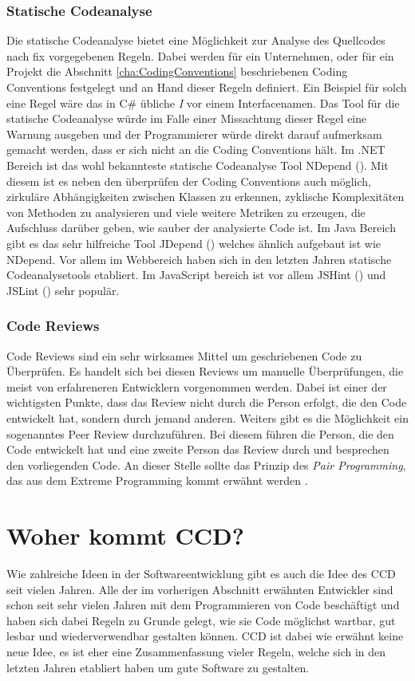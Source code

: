 \subsubsection{Statische Codeanalyse}
Die statische Codeanalyse bietet eine Möglichkeit zur Analyse des Quellcodes nach fix vorgegebenen Regeln. Dabei werden für ein Unternehmen, oder für ein Projekt die Abschnitt \ref{cha:CodingConventions} beschriebenen Coding Conventions festgelegt und an Hand dieser Regeln definiert. Ein Beispiel für solch eine Regel wäre das in C\# übliche \textit{I} vor einem Interfacenamen. Das Tool für die statische Codeanalyse würde im Falle einer Missachtung dieser Regel eine Warnung ausgeben und der Programmierer würde direkt darauf aufmerksam gemacht werden, dass er sich nicht an die Coding Conventions hält. Im .NET Bereich ist das wohl bekannteste statische Codeanalyse Tool NDepend (\cite{NDepend2016}). Mit diesem ist es neben den überprüfen der Coding Conventions auch möglich, zirkuläre Abhängigkeiten zwischen Klassen zu erkennen, zyklische Komplexitäten von Methoden zu analysieren und viele weitere Metriken zu erzeugen, die Aufschluss darüber geben, wie sauber der analysierte Code ist. Im Java Bereich gibt es das sehr hilfreiche Tool JDepend (\cite{JDepend2016}) welches ähnlich aufgebaut ist wie NDepend. Vor allem im Webbereich haben sich in den letzten Jahren statische Codeanalysetools etabliert. Im JavaScript bereich ist vor allem JSHint (\cite{JSHint2016})  und JSLint (\cite{JSLint2016}) sehr populär. 

\subsubsection{Code Reviews}
Code Reviews sind ein sehr wirksames Mittel um geschriebenen Code zu Überprüfen. Es handelt sich bei diesen Reviews um manuelle Überprüfungen, die meist von erfahreneren Entwicklern vorgenommen werden. Dabei ist einer der wichtigsten Punkte, dass das Review nicht durch die Person erfolgt, die den Code entwickelt hat, sondern durch jemand anderen. Weiters gibt es die Möglichkeit ein sogenanntes Peer Review durchzuführen. Bei diesem führen die Person, die den Code entwickelt hat und eine zweite Person das Review durch und besprechen den vorliegenden Code. An dieser Stelle sollte das Prinzip des \textit{Pair Programming}, das aus dem Extreme Programming kommt erwähnt werden \cite{Beck2005}. 


\section{Woher kommt CCD?}
Wie zahlreiche Ideen in der Softwareentwicklung gibt es auch die Idee des CCD seit vielen Jahren. Alle der im vorherigen Abschnitt erwähnten Entwickler sind schon seit sehr vielen Jahren mit dem Programmieren von Code beschäftigt und haben sich dabei Regeln zu Grunde gelegt, wie sie Code möglichst wartbar, gut lesbar und wiederverwendbar gestalten können. CCD ist dabei wie erwähnt keine neue Idee, es ist eher eine Zusammenfassung vieler Regeln, welche sich in den letzten Jahren etabliert haben um gute Software zu gestalten.

